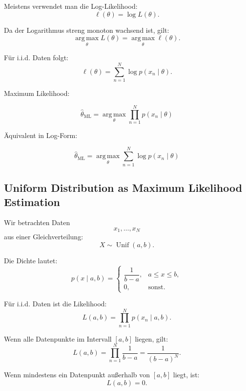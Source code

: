 \documentclass[11pt,a4paper]{scrartcl}
\begin{document}
\begin{calculationbox}
    Meistens verwendet man die Log-Likelihood:
    \[
        \ell(\theta)
        =
        \log L(\theta).
    \]

    Da der Logarithmus streng monoton wachsend ist, gilt:
    \[
        \operatorname*{arg\,max}_{\theta} L(\theta)
        =
        \operatorname*{arg\,max}_{\theta} \ell(\theta).
    \]

    Für i.i.d. Daten folgt:
    \[
        \ell(\theta)
        =
        \sum_{n=1}^{N}
        \log p(x_n \mid \theta).
    \]
\end{calculationbox}

\begin{answerbox}
    Maximum Likelihood:

    \[
        \boxed{
            \hat\theta_{\mathrm{ML}}
            =
            \operatorname*{arg\,max}_{\theta}
            \prod_{n=1}^{N}
            p(x_n \mid \theta)
        }
    \]

    Äquivalent in Log-Form:

    \[
        \boxed{
            \hat\theta_{\mathrm{ML}}
            =
            \operatorname*{arg\,max}_{\theta}
            \sum_{n=1}^{N}
            \log p(x_n \mid \theta)
        }
    \]
\end{answerbox}

\subsection{Uniform Distribution as Maximum Likelihood Estimation}

\begin{notebox}
    Wir betrachten Daten
    \[
        x_1,\dots,x_N
    \]
    aus einer Gleichverteilung:
    \[
        X \sim \operatorname{Unif}(a,b).
    \]

    Die Dichte lautet:
    \[
        p(x \mid a,b)
        =
        \begin{cases}
            \dfrac{1}{b-a}, & a \leq x \leq b,\\[0.8em]
            0, & \text{sonst}.
        \end{cases}
    \]
\end{notebox}

\begin{calculationbox}
    Für i.i.d. Daten ist die Likelihood:
    \[
        L(a,b)
        =
        \prod_{n=1}^{N}
        p(x_n \mid a,b).
    \]

    Wenn alle Datenpunkte im Intervall \([a,b]\) liegen, gilt:
    \[
        L(a,b)
        =
        \prod_{n=1}^{N}
        \frac{1}{b-a}
        =
        \frac{1}{(b-a)^N}.
    \]

    Wenn mindestens ein Datenpunkt außerhalb von \([a,b]\) liegt, ist:
    \[
        L(a,b)=0.
    \]
\end{calculationbox}
\end{document}
